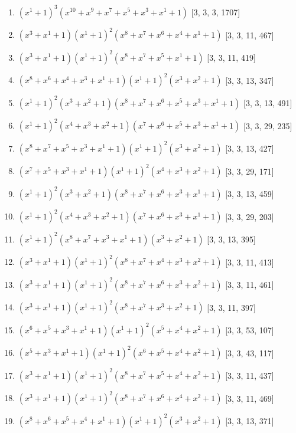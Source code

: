 \documentclass[10pt,twocolumn]{article}
\begin{document}
\begin{enumerate}
\item $(x^{1} + 1)^{3}(x^{10} + x^{9} + x^{7} + x^{5} + x^{3} + x^{1} + 1)$  [3, 3, 3, 1707]
\item $(x^{3} + x^{1} + 1)(x^{1} + 1)^{2}(x^{8} + x^{7} + x^{6} + x^{4} + x^{1} + 1)$  [3, 3, 11, 467]
\item $(x^{3} + x^{1} + 1)(x^{1} + 1)^{2}(x^{8} + x^{7} + x^{5} + x^{1} + 1)$  [3, 3, 11, 419]
\item $(x^{8} + x^{6} + x^{4} + x^{3} + x^{1} + 1)(x^{1} + 1)^{2}(x^{3} + x^{2} + 1)$  [3, 3, 13, 347]
\item $(x^{1} + 1)^{2}(x^{3} + x^{2} + 1)(x^{8} + x^{7} + x^{6} + x^{5} + x^{3} + x^{1} + 1)$  [3, 3, 13, 491]
\item $(x^{1} + 1)^{2}(x^{4} + x^{3} + x^{2} + 1)(x^{7} + x^{6} + x^{5} + x^{3} + x^{1} + 1)$  [3, 3, 29, 235]
\item $(x^{8} + x^{7} + x^{5} + x^{3} + x^{1} + 1)(x^{1} + 1)^{2}(x^{3} + x^{2} + 1)$  [3, 3, 13, 427]
\item $(x^{7} + x^{5} + x^{3} + x^{1} + 1)(x^{1} + 1)^{2}(x^{4} + x^{3} + x^{2} + 1)$  [3, 3, 29, 171]
\item $(x^{1} + 1)^{2}(x^{3} + x^{2} + 1)(x^{8} + x^{7} + x^{6} + x^{3} + x^{1} + 1)$  [3, 3, 13, 459]
\item $(x^{1} + 1)^{2}(x^{4} + x^{3} + x^{2} + 1)(x^{7} + x^{6} + x^{3} + x^{1} + 1)$  [3, 3, 29, 203]
\item $(x^{1} + 1)^{2}(x^{8} + x^{7} + x^{3} + x^{1} + 1)(x^{3} + x^{2} + 1)$  [3, 3, 13, 395]
\item $(x^{3} + x^{1} + 1)(x^{1} + 1)^{2}(x^{8} + x^{7} + x^{4} + x^{3} + x^{2} + 1)$  [3, 3, 11, 413]
\item $(x^{3} + x^{1} + 1)(x^{1} + 1)^{2}(x^{8} + x^{7} + x^{6} + x^{3} + x^{2} + 1)$  [3, 3, 11, 461]
\item $(x^{3} + x^{1} + 1)(x^{1} + 1)^{2}(x^{8} + x^{7} + x^{3} + x^{2} + 1)$  [3, 3, 11, 397]
\item $(x^{6} + x^{5} + x^{3} + x^{1} + 1)(x^{1} + 1)^{2}(x^{5} + x^{4} + x^{2} + 1)$  [3, 3, 53, 107]
\item $(x^{5} + x^{3} + x^{1} + 1)(x^{1} + 1)^{2}(x^{6} + x^{5} + x^{4} + x^{2} + 1)$  [3, 3, 43, 117]
\item $(x^{3} + x^{1} + 1)(x^{1} + 1)^{2}(x^{8} + x^{7} + x^{5} + x^{4} + x^{2} + 1)$  [3, 3, 11, 437]
\item $(x^{3} + x^{1} + 1)(x^{1} + 1)^{2}(x^{8} + x^{7} + x^{6} + x^{4} + x^{2} + 1)$  [3, 3, 11, 469]
\item $(x^{8} + x^{6} + x^{5} + x^{4} + x^{1} + 1)(x^{1} + 1)^{2}(x^{3} + x^{2} + 1)$  [3, 3, 13, 371]

\end{enumerate}
\end{document}
